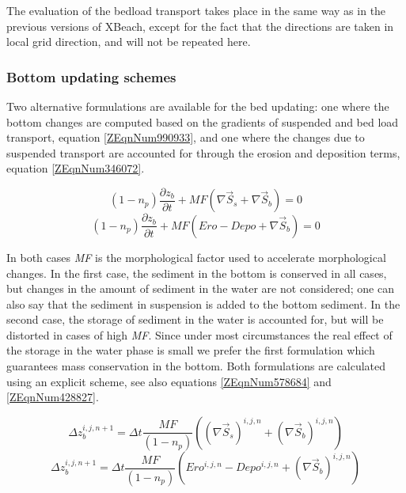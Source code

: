 \documentclass{article}
\begin{document}
\noindent The evaluation of the bedload transport takes place in the same way as in the previous versions of XBeach, except for the fact that the directions are taken in local grid direction, and will not be repeated here.

\noindent 


\subsubsection{ Bottom updating schemes}

\noindent Two alternative formulations are available for the bed updating: one where the bottom changes are computed based on the gradients of suspended and bed load transport, equation \eqref{ZEqnNum990933}, and one where the changes due to suspended transport are accounted for through the erosion and deposition terms, equation \eqref{ZEqnNum346072}.  

\noindent 
\begin{equation} \label{ZEqnNum990933} 
\left(1-n_{p} \right)\frac{\partial z_{b} }{\partial t} +MF\left(\nabla \overrightarrow{S}_{s} +\nabla \overrightarrow{S}_{b} \right)=0 
\end{equation} 
\begin{equation} \label{ZEqnNum346072} 
\left(1-n_{p} \right)\frac{\partial z_{b} }{\partial t} +MF\left(Ero-Depo+\nabla \overrightarrow{S}_{b} \right)=0 
\end{equation} 


\noindent In both cases \textit{MF }is the morphological factor used to accelerate morphological changes. In the first case, the sediment in the bottom is conserved in all cases, but changes in the amount of sediment in the water are not considered; one can also say that the sediment in suspension is added to the bottom sediment. In the second case, the storage of sediment in the water is accounted for, but will be distorted in cases of high \textit{MF}. Since under most circumstances the real effect of the storage in the water phase is small we prefer the first formulation which guarantees mass conservation in the bottom. Both formulations are calculated using an explicit scheme, see also equations \eqref{ZEqnNum578684} and \eqref{ZEqnNum428827}.

\noindent 
\begin{equation} \label{ZEqnNum578684} 
\Delta z_{b} ^{i,j,n+1} =\Delta t\frac{MF}{\left(1-n_{p} \right)} \left(\left(\nabla \overrightarrow{S}_{s} \right)^{i,j,n} +\left(\nabla \overrightarrow{S}_{b} \right)^{i,j,n} \right) 
\end{equation} 
\begin{equation} \label{ZEqnNum428827} 
\Delta z_{b} ^{i,j,n+1} =\Delta t\frac{MF}{(1-n_{p} )} \left(Ero^{i,j,n} -Depo^{i,j,n} +\left(\nabla \overrightarrow{S}_{b} \right)^{i,j,n} \right) 
\end{equation} 
\end{document}
